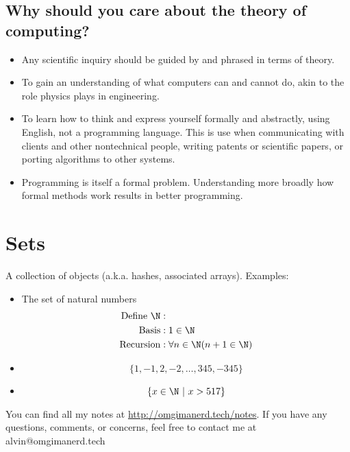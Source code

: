 \documentclass[letterpaper, 12pt]{math}
\begin{document}
\subsection*{Why should you care about the theory of computing?}
\begin{itemize}
  \item Any scientific inquiry should be guided by and phrased in
    terms of theory.
  \item To gain an understanding of what computers can and cannot do, akin
    to the role physics plays in engineering.
  \item To learn how to think and express yourself formally and abstractly,
    using English, not a programming language. This is use when communicating
    with clients and other nontechnical people, writing patents or scientific
    papers, or porting algorithms to other systems.
  \item Programming is itself a formal problem. Understanding more broadly how
    formal methods work results in better programming.
\end{itemize}

\section*{Sets}
A collection of objects (a.k.a. hashes, associated arrays). Examples:
\begin{itemize}
  \item The set of natural numbers
  \begin{align*}
    \mathrm{Define}\ \N&: \\
    \mathrm{Basis}&: 1\in\N \\
    \mathrm{Recursion}&: \forall n\in\N(n+1\in\N)
  \end{align*}
  \item \[ \{1,-1,2,-2,\dots,345,-345\} \]
  \item \[ \{x\in\N\ |\ x>517\} \]
\end{itemize}

\begin{center}
  You can find all my notes at \url{http://omgimanerd.tech/notes}. If you have
  any questions, comments, or concerns, feel free to contact me at
  alvin@omgimanerd.tech
\end{center}
\end{document}
